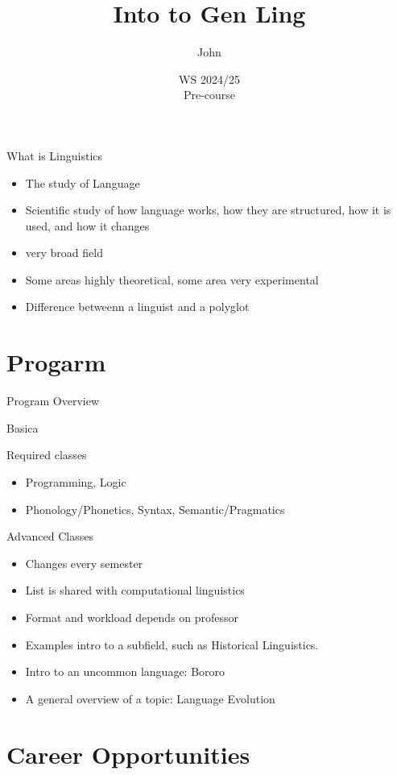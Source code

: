 \documentclass[aspectratio=169,hyperref={unicode}]{beamer}
\title{Into to Gen Ling}
\author{John}
\institute{Fachschaft General \& Computational Linguistics\\ \textbf{University of Tübingen}}
\date{WS 2024/25 \\ Pre-course}
\begin{document}
\frame{\titlepage}


\begin{frame}{What is Linguistics}
  \begin{itemize}
\item The study of Language
          \item Scientific study of how language works, how they are structured, how it is used, and how it changes
    \item very broad field
          \item Some areas highly theoretical, some area very experimental
          \item Difference betweenn a linguist and a polyglot
  \end{itemize}
\end{frame}

\section{Progarm}

\begin{frame}{Program Overview}

  Basica
\end{frame}

\begin{frame}{Required classes}
\begin{itemize}
  \item Programming, Logic
        \item Phonology/Phonetics, Syntax, Semantic/Pragmatics
\end{itemize}

\end{frame}
\begin{frame}{Advanced Classes}
  \begin{itemize}
  \item Changes every semester
  \item List is shared with computational linguistics
  \item Format and workload depends on professor
  \item Examples intro to a subfield, such as Historical Linguistics.
  \item Intro to an uncommon language: Bororo
  \item A general overview of a topic: Language Evolution
  \end{itemize}
\end{frame}
\section{Career Opportunities}
\end{document}
